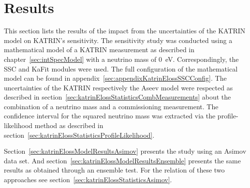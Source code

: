 \section{Results}
\label{sec:katrinElossModelResults}
This section lists the results of the impact from the uncertainties of the KATRIN model on KATRIN's sensitivity. The sensitivity study was conducted using a mathematical model of a KATRIN measurement as described in chapter~\ref{sec:intSpecModel} with a neutrino mass of \SI{0}{eV}. Correspondingly, the SSC and KaFit modules were used. The full configuration of the mathematical model can be found in appendix~\ref{sec:appendixKatrinElossSSCConfig}. The uncertainties of the KATRIN respectively the Aseev model were respected as described in section~\ref{sec:katrinElossStatisticsCombMeasurements} about the combination of a neutrino mass and a commissioning measurement. The confidence interval for the squared neutrino mass was extracted via the profile-likelihood method as described in section~\ref{sec:katrinElossStatisticsProfileLikelihood}.

Section~\ref{sec:katrinElossModelResultsAsimov} presents the study using an Asimov data set. And section~\ref{sec:katrinElossModelResultsEnsemble} presents the same results as obtained through an ensemble test. For the relation of these two approaches see section~\ref{sec:katrinElossStatisticsAsimov}.
